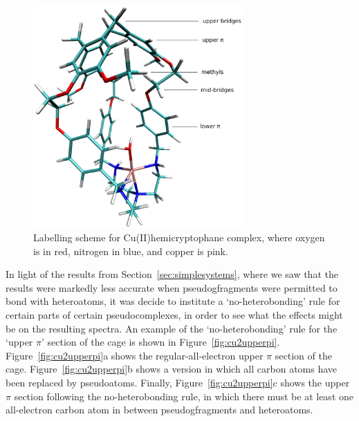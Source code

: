 \documentclass[aip,reprint,nofootinbib]{revtex4-1}
\begin{document}
\begin{figure}
\begin{center}
\includegraphics[width=8cm]{cagecubondslabels}
\caption{Labelling scheme for Cu(II)hemicryptophane complex,  where oxygen is in red, nitrogen in blue, and copper is pink.}\label{fig:cu2labellingscheme}
\end{center}
\end{figure}

In light of the results from Section~\ref{sec:simplesystems}, where we saw that the results were markedly less accurate when pseudogfragments were permitted to bond with heteroatoms, it was decide to institute a `no-heterobonding' rule for certain parts of certain pseudocomplexes, in order to see what the effects might be on the resulting spectra. An example of the `no-heterobonding' rule for the `upper $\pi$' section of the cage is shown in Figure~\ref{fig:cu2upperpi}. Figure~\ref{fig:cu2upperpi}a shows the regular-all-electron upper $\pi$ section of the cage. Figure~\ref{fig:cu2upperpi}b shows a version in which all carbon atoms have been replaced by pseudoatoms. Finally, Figure~\ref{fig:cu2upperpi}c shows the upper $\pi$ section following the no-heterobonding rule, in which there must be at least one all-electron carbon atom in between pseudogfragments and heteroatoms.
\end{document}
